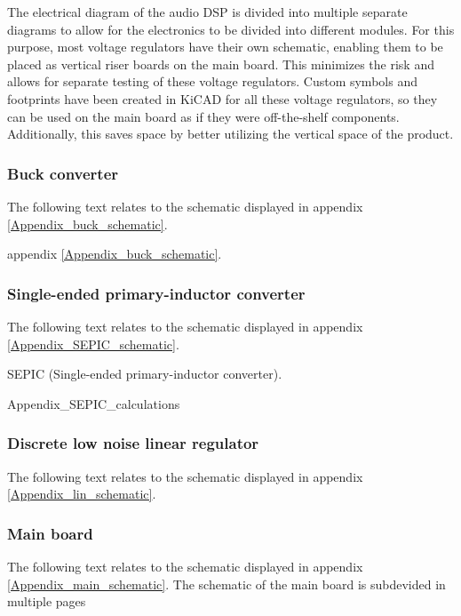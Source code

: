 The electrical diagram of the audio DSP is divided into multiple separate diagrams to allow for the electronics to be divided into different modules. For this purpose, most voltage regulators have their own schematic, enabling them to be placed as vertical riser boards on the main board. This minimizes the risk and allows for separate testing of these voltage regulators. Custom symbols and footprints have been created in KiCAD for all these voltage regulators, so they can be used on the main board as if they were off-the-shelf components. Additionally, this saves space by better utilizing the vertical space of the product.

\subsubsection{Buck converter}
The following text relates to the schematic displayed in appendix \ref{Appendix_buck_schematic}.



appendix \ref{Appendix_buck_schematic}.

\subsubsection{Single-ended primary-inductor converter}
The following text relates to the schematic displayed in appendix \ref{Appendix_SEPIC_schematic}.

SEPIC (Single-ended primary-inductor converter).


Appendix\_SEPIC\_calculations


\subsubsection{Discrete low noise linear regulator}
The following text relates to the schematic displayed in appendix \ref{Appendix_lin_schematic}.

\subsubsection{Main board}
The following text relates to the schematic displayed in appendix \ref{Appendix_main_schematic}.
The schematic of the main board is subdevided in multiple pages